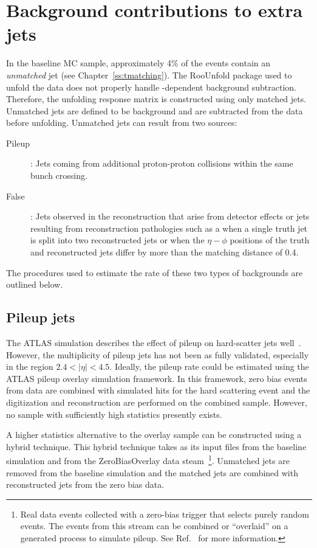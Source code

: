 \section{Background contributions to extra jets}
\label{ss:pileup}
In the baseline MC sample, approximately 4\% of the events contain an \textit{unmatched} jet (see Chapter~\ref{ss:tmatching}). The RooUnfold package used to unfold the data does not properly handle \pT-dependent background subtraction. Therefore, the unfolding response matrix is constructed using only matched jets. Unmatched jets are defined to be background and are subtracted from the data before unfolding. 
Unmatched jets can result from two sources: 
\begin{description}
\item[Pileup]: Jets coming from additional proton-proton collisions within the same bunch crossing.
\item[False]: Jets observed in the reconstruction that arise from detector effects or jets resulting from reconstruction pathologies such as a when a single truth jet is split into two reconstructed jets or when the $\eta-\phi$ positions of the truth and reconstructed jets differ by more than the matching distance of 0.4.
\end{description}
The  procedures used to estimate the rate of these two types of backgrounds are outlined below.

\subsection{Pileup jets}


The ATLAS simulation describes the effect of pileup on hard-scatter jets well~\cite{jetpile}. However, the multiplicity of pileup jets has not been as fully validated, especially in the region $2.4 <  |\eta| < 4.5$.  Ideally, the pileup rate could be
estimated using the ATLAS pileup overlay simulation framework.  In this framework,
zero bias events from data are combined with simulated hits for the hard scattering event
and the digitization and reconstruction are performed on the combined sample. However,
no sample with sufficiently high statistics presently exists.  

A higher statistics alternative to the overlay sample can be constructed using a hybrid technique.
This hybrid technique takes as its input files 
from the baseline simulation and from the ZeroBiasOverlay data steam~\footnote{Real data events collected with a zero-bias trigger that selects purely random events. The events from this stream can be combined or ``overlaid'' on a generated process to simulate pileup. See Ref.~\cite{minbias} for more information.}.  
Unmatched jets are removed from the baseline simulation
and the matched jets are combined with reconstructed jets from the zero bias data.  

